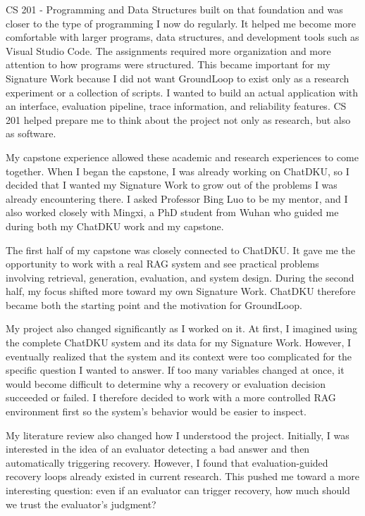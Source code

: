 \documentclass[12pt, a4paper, oneside]{report}
\begin{document}
CS 201 - Programming and Data Structures built on that foundation and was closer to the type of programming I now do regularly. It helped me become more comfortable with larger programs, data structures, and development tools such as Visual Studio Code. The assignments required more organization and more attention to how programs were structured. This became important for my Signature Work because I did not want GroundLoop to exist only as a research experiment or a collection of scripts. I wanted to build an actual application with an interface, evaluation pipeline, trace information, and reliability features. CS 201 helped prepare me to think about the project not only as research, but also as software.

My capstone experience allowed these academic and research experiences to come together. When I began the capstone, I was already working on ChatDKU, so I decided that I wanted my Signature Work to grow out of the problems I was already encountering there. I asked Professor Bing Luo to be my mentor, and I also worked closely with Mingxi, a PhD student from Wuhan who guided me during both my ChatDKU work and my capstone.

The first half of my capstone was closely connected to ChatDKU. It gave me the opportunity to work with a real RAG system and see practical problems involving retrieval, generation, evaluation, and system design. During the second half, my focus shifted more toward my own Signature Work. ChatDKU therefore became both the starting point and the motivation for GroundLoop.

My project also changed significantly as I worked on it. At first, I imagined using the complete ChatDKU system and its data for my Signature Work. However, I eventually realized that the system and its context were too complicated for the specific question I wanted to answer. If too many variables changed at once, it would become difficult to determine why a recovery or evaluation decision succeeded or failed. I therefore decided to work with a more controlled RAG environment first so the system's behavior would be easier to inspect.

My literature review also changed how I understood the project. Initially, I was interested in the idea of an evaluator detecting a bad answer and then automatically triggering recovery. However, I found that evaluation-guided recovery loops already existed in current research. This pushed me toward a more interesting question: even if an evaluator can trigger recovery, how much should we trust the evaluator's judgment?
\end{document}
